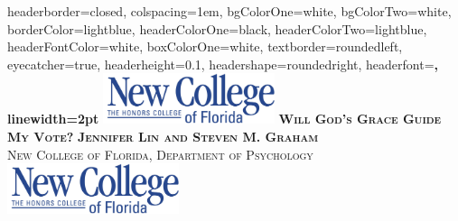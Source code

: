 \documentclass[landscape,a0paper,fontscale=0.285]{baposter} %
\newcommand\tb{\textbf}
\begin{document}
\begin{poster}
{
headerborder=closed, %
colspacing=1em, %
bgColorOne=white, %
bgColorTwo=white, %
borderColor=lightblue, %
headerColorOne=black, %
headerColorTwo=lightblue, %
headerFontColor=white, %
boxColorOne=white, %
textborder=roundedleft, %
eyecatcher=true, %
headerheight=0.1\textheight, %
headershape=roundedright, %
headerfont=\Large\bf\textsc, %
linewidth=2pt %
}
%
{\includegraphics[height=4em]{logo.png}} %
{\bf\textsc{Will God's Grace Guide My Vote?}\smallskip} %
{\textsc{{\LARGE\tb{Jennifer Lin and Steven M. Graham} } \smallskip\\ New College of Florida, Department of Psychology}} %
{\includegraphics[height=4em]{logo}} %



\end{poster}
\end{document}
